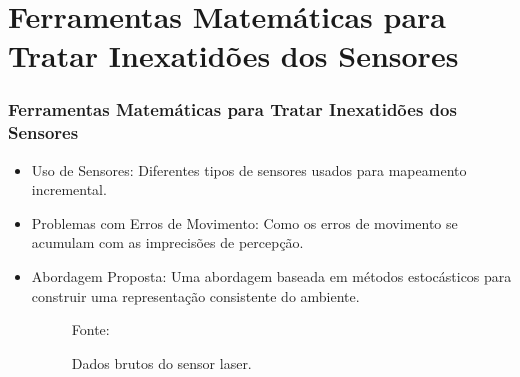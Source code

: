 \documentclass[xcolor=dvipsnames, aspectratio=169]{beamer}
\begin{document}
\section{Ferramentas Matemáticas para Tratar Inexatidões dos Sensores}
  \begin{frame}
  \frametitle{Ferramentas Matemáticas para Tratar Inexatidões dos Sensores}
  \begin{itemize}
      \item Uso de Sensores: Diferentes tipos de sensores usados para mapeamento incremental.
      \item Problemas com Erros de Movimento: Como os erros de movimento se acumulam com as imprecisões de percepção.
      \item Abordagem Proposta: Uma abordagem baseada em métodos estocásticos para construir uma representação consistente do ambiente.
      \begin{figure}
        \centering
        {Fonte: \cite{buniyamin2011simple}}
        \caption{Dados brutos do sensor laser.}
        \label{fig:1_range_sensor_obstacle}
      \end{figure}
  \end{itemize}
  \end{frame}
  
\end{document}
